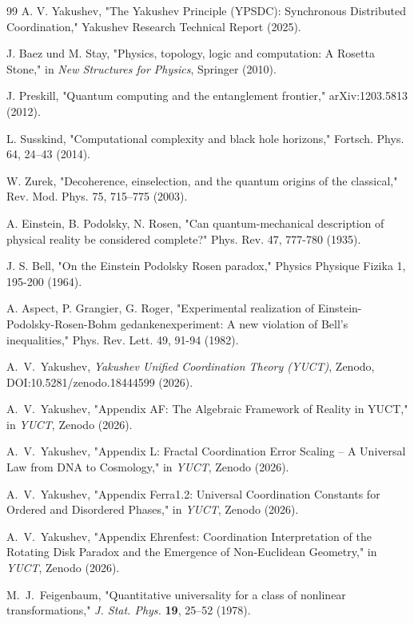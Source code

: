 \documentclass[11pt,a4paper]{article}
\begin{document}
\begin{thebibliography}{99}
		 A. V. Yakushev, "The Yakushev Principle (YPSDC): Synchronous Distributed Coordination," Yakushev Research Technical Report (2025).
		
		 J. Baez und M. Stay, "Physics, topology, logic and computation: A Rosetta Stone," in \emph{New Structures for Physics}, Springer (2010).
		
		 J. Preskill, "Quantum computing and the entanglement frontier," arXiv:1203.5813 (2012).
		
		 L. Susskind, "Computational complexity and black hole horizons," Fortsch. Phys. 64, 24–43 (2014).
		
		 W. Zurek, "Decoherence, einselection, and the quantum origins of the classical," Rev. Mod. Phys. 75, 715–775 (2003).
		
		 A. Einstein, B. Podolsky, N. Rosen, "Can quantum-mechanical description of physical reality be considered complete?" Phys. Rev. 47, 777-780 (1935).
		
		 J. S. Bell, "On the Einstein Podolsky Rosen paradox," Physics Physique Fizika 1, 195-200 (1964).
		
		 A. Aspect, P. Grangier, G. Roger, "Experimental realization of Einstein-Podolsky-Rosen-Bohm gedankenexperiment: A new violation of Bell's inequalities," Phys. Rev. Lett. 49, 91-94 (1982).
		
		A.~V.~Yakushev, \emph{Yakushev Unified Coordination Theory (YUCT)}, Zenodo, DOI:10.5281/zenodo.18444599 (2026).
		
		A.~V.~Yakushev, "Appendix AF: The Algebraic Framework of Reality in YUCT," in \emph{YUCT}, Zenodo (2026).
		
		A.~V.~Yakushev, "Appendix L: Fractal Coordination Error Scaling – A Universal Law from DNA to Cosmology," in \emph{YUCT}, Zenodo (2026).
		
		A.~V.~Yakushev, "Appendix Ferra1.2: Universal Coordination Constants for Ordered and Disordered Phases," in \emph{YUCT}, Zenodo (2026).
		
		A.~V.~Yakushev, "Appendix Ehrenfest: Coordination Interpretation of the Rotating Disk Paradox and the Emergence of Non‑Euclidean Geometry," in \emph{YUCT}, Zenodo (2026).
		
		M.~J.~Feigenbaum, "Quantitative universality for a class of nonlinear transformations," \emph{J. Stat. Phys.} \textbf{19}, 25--52 (1978).
		

\end{thebibliography}
\end{document}
